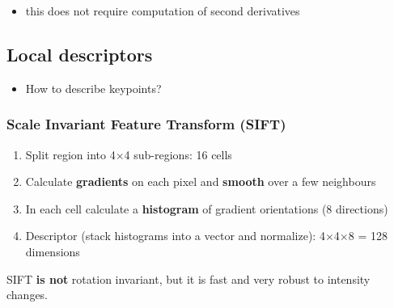 \documentclass{article}
\begin{document}
        \begin{itemize}
            \item this does not require computation of second derivatives
        \end{itemize}

    \subsection{Local descriptors}
    \begin{itemize}
        \item How to describe keypoints?
    \end{itemize}

    \subsubsection{Scale Invariant Feature Transform (SIFT)}
    \begin{enumerate}
        \item Split region into 4$\times$4 sub-regions: 16 cells
        \item Calculate \textbf{gradients} on each pixel and \textbf{smooth} over a few neighbours
        \item In each cell calculate a \textbf{histogram} of gradient orientations (8 directions)
        \item Descriptor (stack histograms into a vector and normalize): 4$\times$4$\times$8 = 128 dimensions
    \end{enumerate}

    SIFT \textbf{is not} rotation invariant, but it is fast and very robust to intensity changes.
\end{document}

